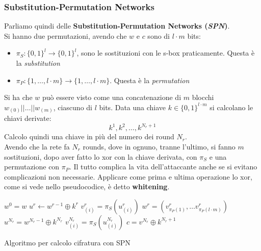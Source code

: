 \documentclass[a4paper,12pt, oneside]{book}
\begin{document}
\subsubsection{Substitution-Permutation Networks}
Parliamo quindi delle \textbf{Substitution-Permutation Networks
  (\textit{SPN})}.\\ 
Si hanno due permutazioni, avendo che $w$ e $c$ sono di $l\cdot m$ bits:
\begin{itemize}
  \item $\pi_S:\{0,1\}^l\to\{0,1\}^l$, sono le sostituzioni con le s-box
  praticamente. Questa è la \textit{substitution}
  \item $\pi_P:\{1,\ldots, l\cdot m\}\to\{1,\ldots, l\cdot m\}$. Questa è la
  \textit{permutation} 
\end{itemize}
Si ha che $w$ può essere visto come una concatenazione di $m$ blocchi
$w_{(0)}||\ldots || w_{(m)}$, ciascuno di $l$ bits. Data una chiave $k\in
\{0,1\}^{l\cdot m}$ si calcolano le chiavi derivate:
\[k^1,k^2,\ldots, k^{N_r+1}\]
Calcolo quindi una chiave in più del numero dei round $N_r$.\\
Avendo che la rete fa $N_r$ rounds, dove in ognuno, tranne l'ultimo, si fanno
$m$ sostituzioni, dopo aver fatto lo xor con la chiave derivata, con $\pi_S$ e
una permutazione con $\pi_P$. Il tutto complica la vita dell'attaccante anche se
si evitano complicazioni non necessarie. Applicare come prima e ultima
operazione lo xor, come si vede nello pseudocodice, è detto \textbf{whitening}.
\begin{algorithm}
  \begin{algorithmic}
    \State $w^0=w$
    \State $u^r\gets w^{r-1}\oplus k^r$ 
    \State $v_{(i)}^r=\pi_S(u^r_{(i)})$
    \State $w^r=(v^r_{\pi_P(1)},\ldots v^r_{\pi_P(l\cdot m)})$
    \EndFor
    \EndFor
    \State $u^{N_r}=w^{N_r-1}\oplus k^{N_r}$
    \State $v_{(i)}^{N_r}=\pi_S(u^{N_r}_{(i)})$
    \EndFor
    \State $c=v^{N_r}\oplus k^{N_r+1}$
    \EndFunction
  \end{algorithmic}
  \caption{Algoritmo per calcolo cifratura con SPN}
\end{algorithm}
\end{document}
